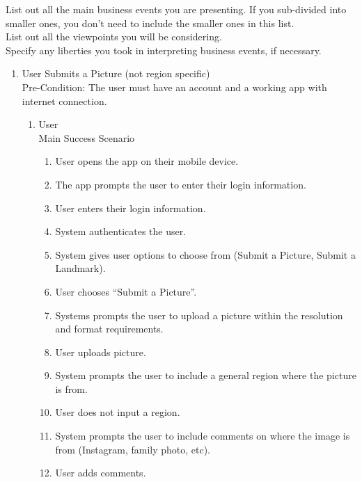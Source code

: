 \documentclass[]{article}
\begin{document}
 List out all the main business events you are presenting. If you sub-divided into smaller ones, you don't need to include the smaller ones in this list.\\

 List out all the viewpoints you will be considering.\\

 Specify any liberties you took in interpreting business events, if necessary.\\

\begin{enumerate}[{\bf BE1.}]
	\item User Submits a Picture (not region specific)
        \\ Pre-Condition: The user must have an account and a working app with internet connection. 
		\begin{enumerate}[{\bf VP1.}]
			\item User \\
				Main Success Scenario
                    \begin{enumerate}[{1.}]
                        \item User opens the app on their mobile device.
                        \item The app prompts the user to enter their login information.
                        \item User enters their login information.
                        \item System authenticates the user. 
                        \item System gives user options to choose from (Submit a Picture, Submit a Landmark). 
                        \item User chooses “Submit a Picture”. 
                        \item Systems prompts the user to upload a picture within the resolution and format requirements.
                        \item User uploads picture.
                        \item System prompts the user to include a general region where the picture is from. 
                        \item User does not input a region. 
                        \item System prompts the user to include comments on where the image is from (Instagram, family photo, etc). 
                        \item User adds comments.

\end{enumerate}
\end{enumerate}
\end{enumerate}
\end{document}
